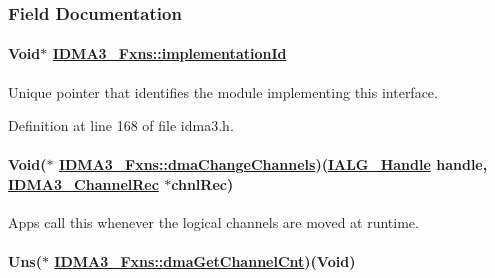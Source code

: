 \subsubsection{Field Documentation}
\hypertarget{struct_i_d_m_a3___fxns_4ee5aca6d6f29e0e09c83eaae2a44aec}{
\paragraph[implementationId]{\setlength{\rightskip}{0pt plus 5cm}Void$\ast$ \hyperlink{struct_i_d_m_a3___fxns_4ee5aca6d6f29e0e09c83eaae2a44aec}{IDMA3\_\-Fxns::implementation\-Id}}\hfill}
\label{struct_i_d_m_a3___fxns_4ee5aca6d6f29e0e09c83eaae2a44aec}


Unique pointer that identifies the module implementing this interface. 



Definition at line 168 of file idma3.h.\hypertarget{struct_i_d_m_a3___fxns_1b05e503408ceb2849174d520932aa08}{
\paragraph[dmaChangeChannels]{\setlength{\rightskip}{0pt plus 5cm}Void($\ast$ \hyperlink{struct_i_d_m_a3___fxns_1b05e503408ceb2849174d520932aa08}{IDMA3\_\-Fxns::dma\-Change\-Channels})(\hyperlink{struct_i_a_l_g___obj}{IALG\_\-Handle} handle, \hyperlink{struct_i_d_m_a3___channel_rec}{IDMA3\_\-Channel\-Rec} $\ast$chnl\-Rec)}\hfill}
\label{struct_i_d_m_a3___fxns_1b05e503408ceb2849174d520932aa08}


Apps call this whenever the logical channels are moved at runtime. 

\hypertarget{struct_i_d_m_a3___fxns_2f893a5ce598a401aecf9e79a5d973d2}{
\paragraph[dmaGetChannelCnt]{\setlength{\rightskip}{0pt plus 5cm}Uns($\ast$ \hyperlink{struct_i_d_m_a3___fxns_2f893a5ce598a401aecf9e79a5d973d2}{IDMA3\_\-Fxns::dma\-Get\-Channel\-Cnt})(Void)}\hfill}
\label{struct_i_d_m_a3___fxns_2f893a5ce598a401aecf9e79a5d973d2}


